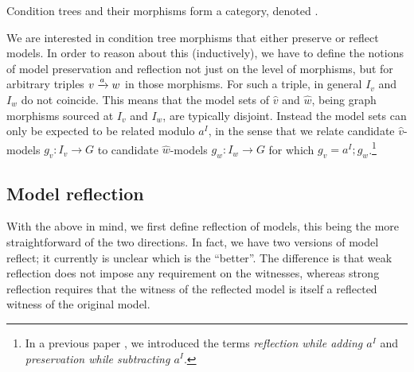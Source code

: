 \begin{proposition}
Condition trees and their morphisms form a category, denoted {\CT}.
\end{proposition}
%
We are interested in condition tree morphisms that either preserve or reflect models. In order to reason about this (inductively), we have to define the notions of model preservation and reflection not just on the level of morphisms, but for arbitrary triples ${v}\xrightarrow{a}{w}$ in those morphisms. For such a triple, in general $I_v$ and $I_w$ do not coincide. This means that the model sets of $\hat v$ and $\hat w$, being graph morphisms sourced at $I_v$ and $I_w$, are typically disjoint. Instead the model sets can only be expected to be related modulo $a^I$, in the sense that we relate candidate $\hat v$-models $g_v:I_v\to G$ to candidate $\hat w$-models $g_w:I_w\to G$ for which $g_v=a^I;g_w$.\footnote{In a previous paper \cite{RensCorr}, we introduced the terms \emph{reflection while adding $a^I$} and \emph{preservation while subtracting $a^I$}.}

\subsection{Model reflection}

With the above in mind, we first define reflection of models, this being the more straightforward of the two directions. In fact, we have two versions of model reflect; it currently is unclear which is the ``better''. The difference is that weak reflection does not impose any requirement on the witnesses, whereas strong reflection requires that the witness of the reflected model is itself a reflected witness of the original model.

